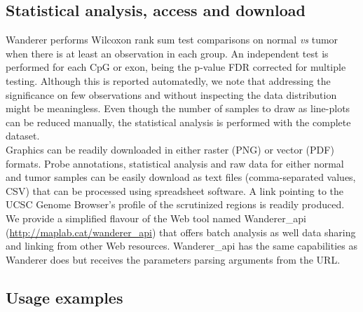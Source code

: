 \documentclass{bmcart}
\begin{document}
\subsection*{Statistical analysis, access and download}

Wanderer performs Wilcoxon rank sum test comparisons on normal \textit{vs} tumor when there is at least an observation in each group. An independent test is performed for each CpG or exon, being the p-value FDR corrected for multiple testing. Although this is reported automatedly, we note that addressing the significance on few observations and without inspecting the data distribution might be meaningless. Even though the number of samples to draw as line-plots can be reduced manually, the statistical analysis is performed with the complete dataset.\\

Graphics can be readily downloaded in either raster (PNG) or vector (PDF) formats. Probe annotations, statistical analysis and raw data for either normal and tumor samples can be easily download as text files (comma-separated values, CSV) that can be processed using spreadsheet software. A link pointing to the UCSC Genome Browser's profile of the scrutinized regions is readily produced.\\

We provide a simplified flavour of the Web tool named Wanderer\_api (\url{http://maplab.cat/wanderer_api}) that offers batch analysis as well data sharing and linking from other Web resources. Wanderer\_api has the same capabilities as Wanderer does but receives the parameters parsing arguments from the URL. %




\subsection*{Usage examples}
 
\end{document}
